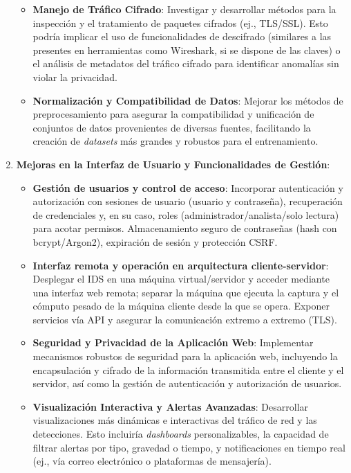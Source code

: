 \begin{enumerate}
\begin{itemize}
        \item\textbf{Manejo de Tráfico Cifrado}: Investigar y desarrollar métodos para la inspección y el tratamiento de paquetes cifrados (ej., TLS/SSL). Esto podría implicar el uso de funcionalidades de descifrado (similares a las presentes en herramientas como Wireshark, si se dispone de las claves) o el análisis de metadatos del tráfico cifrado para identificar anomalías sin violar la privacidad.
        
        \item\textbf{Normalización y Compatibilidad de Datos}: Mejorar los métodos de preprocesamiento para asegurar la compatibilidad y unificación de conjuntos de datos provenientes de diversas fuentes, facilitando la creación de \textit{datasets} más grandes y robustos para el entrenamiento.

    \end{itemize}

    \item\textbf{Mejoras en la Interfaz de Usuario y Funcionalidades de Gestión}:

    \begin{itemize}
    
        \item\textbf{Gestión de usuarios y control de acceso}: Incorporar autenticación y autorización con sesiones de usuario (usuario y contraseña), recuperación de credenciales y, en su caso, roles (administrador/analista/solo lectura) para acotar permisos. Almacenamiento seguro de contraseñas (hash con bcrypt/Argon2), expiración de sesión y protección CSRF.
        
        \item\textbf{Interfaz remota y operación en arquitectura cliente-servidor}: Desplegar el IDS en una máquina virtual/servidor y acceder mediante una interfaz web remota; separar la máquina que ejecuta la captura y el cómputo pesado de la máquina cliente desde la que se opera. Exponer servicios vía API y asegurar la comunicación extremo a extremo (TLS).
        
        \item\textbf{Seguridad y Privacidad de la Aplicación Web}: Implementar mecanismos robustos de seguridad para la aplicación web, incluyendo la encapsulación y cifrado de la información transmitida entre el cliente y el servidor, así como la gestión de autenticación y autorización de usuarios.
        
        \item\textbf{Visualización Interactiva y Alertas Avanzadas}: Desarrollar visualizaciones más dinámicas e interactivas del tráfico de red y las detecciones. Esto incluiría \textit{dashboards} personalizables, la capacidad de filtrar alertas por tipo, gravedad o tiempo, y notificaciones en tiempo real (ej., vía correo electrónico o plataformas de mensajería).
        

\end{itemize}
\end{enumerate}
